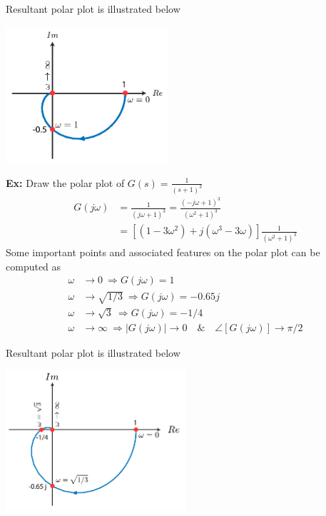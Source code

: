 \documentclass{article}
\begin{document}
Resultant polar plot is illustrated below

\vspace{6 pt}

  \begin{minipage}[h]{1\linewidth}
    \begin{center}
      \includegraphics[width=0.45\textwidth]{polar4}
    \end{center}
  \end{minipage}

\vspace{6 pt}

\textbf{Ex:} Draw the polar plot of  $G(s) = \frac{1}{(s+1)^3}$
%
\begin{align*}
  G(j \omega ) &= \frac{1}{ (j \omega + 1)^3 } = \frac{ (-j \omega + 1)^3 }{( \omega^2 +1 )^3 }
\\
&= \left[ \left( 1 - 3 \omega^2 \right) + j (\omega^3 - 3 \omega) \right] \frac{1}{( \omega^2 +1 )^3 }
\end{align*}
%
Some important points and associated features on the polar plot can be computed as
\begin{align*}
  \omega &\to 0 \ \Rightarrow G(j \omega) = 1
\\
 \omega &\to \sqrt{1/3} \ \Rightarrow G(j \omega) = -0.65 j 
\\
 \omega &\to \sqrt{3} \ \Rightarrow G(j \omega) = -1/4 
\\
 \omega &\to  \infty \ \Rightarrow | G(j \omega) | \to 0 \quad \& \quad \angle  [ G(j \omega) ] \to \pi/2
\end{align*}

Resultant polar plot is illustrated below

\vspace{6 pt}

  \begin{minipage}[h]{1\linewidth}
    \begin{center}
      \includegraphics[width=0.5\textwidth]{polar5}
    \end{center}
  \end{minipage}
\end{document}
